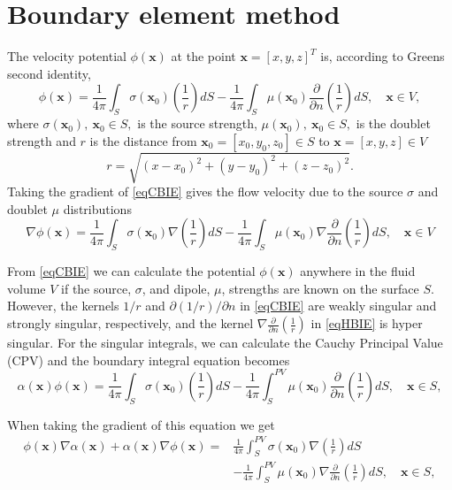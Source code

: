 \documentclass[]{book}
\newcommand{\V}[1]{\boldsymbol{#1}}
\begin{document}
\chapter{Boundary element method}
The velocity potential $\phi(\V{x})$ at the point $\V{x} = \left[x,y,z\right]^T$ is, according to Greens second identity, 
\begin{equation}
	\phi(\V{x}) = 
	 \frac{1}{4 \pi} \int_{S} \sigma (\V{x}_0) \left(\frac{1}{r} \right) dS
	- \frac{1}{4 \pi} \int_{S} \mu(\V{x}_0)  \frac{\partial }{\partial n} \left( \frac{1}{r}\right) dS, \quad \V{x} \in V,
\label{eqCBIE}
\end{equation}
where $\sigma(\V{x}_0),~ \V{x}_0 \in S,$ is the source strength, $\mu(\V{x}_0),~ \V{x}_0 \in S,$ is the doublet strength and $r$ is the distance from $\V{x}_0 = \left[x_0,y_0,z_0\right] \in S$ to $\V{x} = \left[x,y,z\right] \in V$
\begin{equation}
r = \sqrt{(x-x_0)^2 + (y-y_0)^2 + (z-z_0)^2}.
\end{equation}
Taking the gradient of \eqref{eqCBIE} gives the flow velocity due to the source $\sigma$ and doublet $\mu$ distributions 
\begin{equation}
\nabla \phi(\V{x}) = 
 \frac{1}{4 \pi} \int_{S} \sigma (\V{x}_0) \nabla\left(\frac{1}{r} \right) dS
- \frac{1}{4 \pi} \int_{S} \mu(\V{x}_0) \nabla \frac{\partial }{\partial n} \left( \frac{1}{r}\right) dS, \quad \V{x} \in V
\label{eqHBIE}
\end{equation}

From \ref{eqCBIE} we can calculate the potential $\phi(\V{x})$ anywhere in the fluid volume $V$ if the source, $\sigma$, and dipole, $\mu$, strengths are known on the surface $S$. However, the kernels $1/r$ and $ \partial (1/r)/\partial n$ in \ref{eqCBIE} are weakly singular and strongly singular, respectively, and the kernel $\nabla \frac{\partial }{\partial n} \left( \frac{1}{r}\right)$ in \eqref{eqHBIE} is hyper singular. For the singular integrals, we can calculate the Cauchy Principal Value (CPV) and the  boundary integral equation becomes
\begin{equation}
\alpha (\V{x}) \phi(\V{x}) = 
 \frac{1}{4 \pi} \int_{S} \sigma (\V{x}_0) \left(\frac{1}{r} \right) dS
- \frac{1}{4 \pi} \int_{S}^{PV} \mu(\V{x}_0)  \frac{\partial }{\partial n} \left( \frac{1}{r}\right) dS, \quad \V{x} \in S,
\label{eqCBIE_CPV}
\end{equation}

When taking the gradient of this equation we get 
\begin{align}
\phi(\V{x})\nabla \alpha(\V{x})+\alpha(\V{x})\nabla \phi(\V{x}) = & \frac{1}{4 \pi} \int_{S}^{PV} \sigma (\V{x}_0) \nabla\left(\frac{1}{r} \right) dS \nonumber \\
&- \frac{1}{4 \pi} \int_{S}^{PV} \mu(\V{x}_0) \nabla \frac{\partial }{\partial n} \left( \frac{1}{r}\right) dS, \quad \V{x} \in S,
\label{eqHBIE_CPV}
\end{align}
\end{document}
